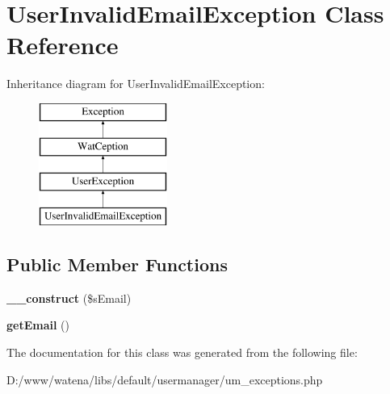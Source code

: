 \hypertarget{class_user_invalid_email_exception}{\section{User\-Invalid\-Email\-Exception Class Reference}
\label{class_user_invalid_email_exception}
}
Inheritance diagram for User\-Invalid\-Email\-Exception\-:\begin{figure}[H]
\begin{center}
\leavevmode
\includegraphics[height=4.000000cm]{class_user_invalid_email_exception}
\end{center}
\end{figure}
\subsection*{Public Member Functions}
\begin{DoxyCompactItemize}
\item 
\hypertarget{class_user_invalid_email_exception_aa3f0816cffc3f033f2acac2a0ffee041}{{\bfseries \-\_\-\-\_\-construct} (\$s\-Email)}\label{class_user_invalid_email_exception_aa3f0816cffc3f033f2acac2a0ffee041}

\item 
\hypertarget{class_user_invalid_email_exception_a2faf7e61d000b0a54689783d3cace16c}{{\bfseries get\-Email} ()}\label{class_user_invalid_email_exception_a2faf7e61d000b0a54689783d3cace16c}

\end{DoxyCompactItemize}


The documentation for this class was generated from the following file\-:\begin{DoxyCompactItemize}
\item 
D\-:/www/watena/libs/default/usermanager/um\-\_\-exceptions.\-php\end{DoxyCompactItemize}
